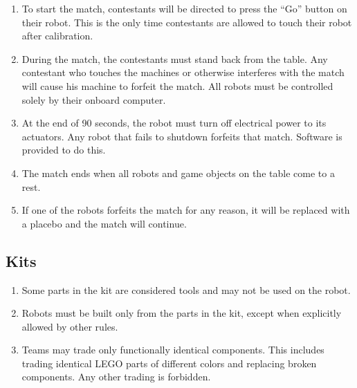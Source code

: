 \begin{enumerate}
\item To start the match, contestants will be directed to press the ``Go''
button on their robot. This is the only time contestants are allowed to touch
their robot after calibration.

\item During the match, the contestants must stand back from the table. Any
contestant who touches the machines or otherwise interferes with the match will
cause his machine to forfeit the match. All robots must be controlled solely by
their onboard computer.

\item At the end of 90 seconds, the robot must turn off electrical power to its
actuators.  Any robot that fails to shutdown forfeits that match. Software is
provided to do this.

\item The match ends when all robots and game objects on the table come to a
rest.

\item If one of the robots forfeits the match for any reason, it will be
replaced with a placebo and the match will continue.

\end{enumerate}

\subsection{Kits}
\begin{enumerate}

\item Some parts in the kit are considered tools and may not be used on the
robot.

\item Robots must be built only from the parts in the kit, except when
explicitly allowed by other rules.

\item Teams may trade only functionally identical components. This includes
trading identical LEGO parts of different colors and replacing broken
components. Any other trading is forbidden.

\end{enumerate}

